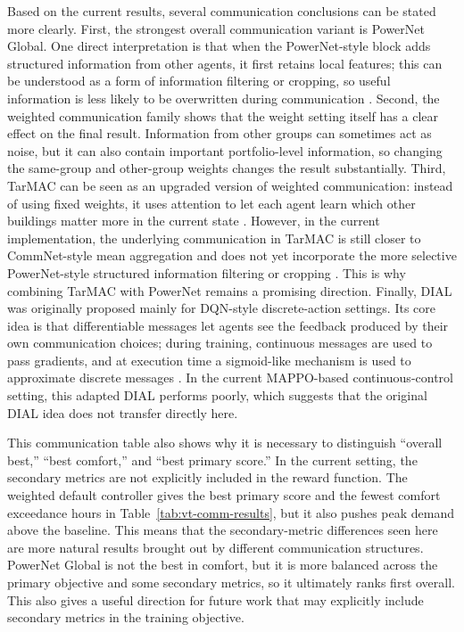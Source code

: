 Based on the current results, several communication conclusions can be stated
more clearly. First, the strongest overall communication variant is
PowerNet Global. One direct interpretation is that when the PowerNet-style
block adds structured information from other agents, it first retains local
features; this can be understood as a form of information filtering or
cropping, so useful information is less likely to be overwritten during
communication \cite{powernet2020}. Second, the weighted communication family
shows that the weight setting itself has a clear effect on the final result.
Information from other groups can sometimes act as noise, but it can also
contain important portfolio-level information, so changing the same-group and
other-group weights changes the result substantially. Third, TarMAC can be seen
as an upgraded version of weighted communication: instead of using fixed
weights, it uses attention to let each agent learn which other buildings matter
more in the current state \cite{tarmac2019}. However, in the current
implementation, the underlying communication in TarMAC is still closer to
CommNet-style mean aggregation and does not yet incorporate the more selective
PowerNet-style structured information filtering or cropping
\cite{commnet2016}. This is why combining TarMAC with PowerNet remains a
promising direction. Finally, DIAL was originally proposed mainly for
DQN-style discrete-action settings. Its core idea is that differentiable
messages let agents see the feedback produced by their own communication
choices; during training, continuous messages are used to pass gradients, and
at execution time a sigmoid-like mechanism is used to approximate discrete
messages \cite{dial2016}. In the current MAPPO-based continuous-control
setting, this adapted DIAL performs poorly, which suggests that the original
DIAL idea does not transfer directly here.

This communication table also shows why it is necessary to distinguish
``overall best,'' ``best comfort,'' and ``best primary score.'' In the current
setting, the secondary metrics are not explicitly included in the reward
function. The weighted default controller gives the best primary score and the
fewest comfort exceedance hours in Table~\ref{tab:vt-comm-results}, but it also
pushes peak demand above the baseline. This means that the secondary-metric
differences seen here are more natural results brought out by different
communication structures. PowerNet Global is not the best in comfort, but it is
more balanced across the primary objective and some secondary metrics, so it
ultimately ranks first overall. This also gives a useful direction for future
work that may explicitly include secondary metrics in the training objective.

